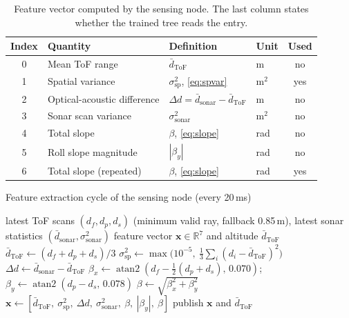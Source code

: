\documentclass[11pt,a4paper]{article}
\newcommand{\vect}[1]{\bm{#1}}
\begin{document}
\begin{table}[ht]
\centering
\small
\begin{tabular}{@{}c L{3.4cm} L{5.9cm} l c@{}}
\toprule
\textbf{Index} & \textbf{Quantity} & \textbf{Definition} & \textbf{Unit} & \textbf{Used}\\
 & Mean ToF range & $\bar d_{\mathrm{ToF}}$ & m & no\\
1 & Spatial variance & $\sigma^2_{\mathrm{sp}}$, \eqref{eq:spvar} & m$^2$ & yes\\
2 & Optical-acoustic difference & $\Delta d=\bar d_{\mathrm{sonar}}-\bar d_{\mathrm{ToF}}$ & m & no\\
3 & Sonar scan variance & $\sigma^2_{\mathrm{sonar}}$ & m$^2$ & no\\
4 & Total slope & $\beta$, \eqref{eq:slope} & rad & no\\
5 & Roll slope magnitude & $|\beta_y|$ & rad & no\\
6 & Total slope (repeated) & $\beta$, \eqref{eq:slope} & rad & yes\\
\bottomrule
\end{tabular}
\caption{Feature vector computed by the sensing node. The last column states whether the trained tree reads the entry.}
\label{tab:features}
\end{table}
 
\begin{algorithm}[ht]
\caption{Feature extraction cycle of the sensing node (every 20\,ms)}\label{alg:features}
\begin{algorithmic}[1]
\Require latest ToF scans $(d_f,d_p,d_s)$ (minimum valid ray, fallback 0.85\,m), latest sonar statistics $(\bar d_{\mathrm{sonar}},\sigma^2_{\mathrm{sonar}})$
\Ensure feature vector $\vect x\in\mathbb R^7$ and altitude $\bar d_{\mathrm{ToF}}$
\State $\bar d_{\mathrm{ToF}}\gets(d_f+d_p+d_s)/3$
\State $\sigma^2_{\mathrm{sp}}\gets\max\bigl(10^{-5},\ \tfrac13\sum_i(d_i-\bar d_{\mathrm{ToF}})^2\bigr)$
\State $\Delta d\gets\bar d_{\mathrm{sonar}}-\bar d_{\mathrm{ToF}}$
\State $\beta_x\gets\operatorname{atan2}(d_f-\tfrac12(d_p+d_s),\,0.070)$;\quad $\beta_y\gets\operatorname{atan2}(d_p-d_s,\,0.078)$
\State $\beta\gets\sqrt{\beta_x^2+\beta_y^2}$
\State $\vect x\gets[\bar d_{\mathrm{ToF}},\ \sigma^2_{\mathrm{sp}},\ \Delta d,\ \sigma^2_{\mathrm{sonar}},\ \beta,\ |\beta_y|,\ \beta]$
\State publish $\vect x$ and $\bar d_{\mathrm{ToF}}$
\end{algorithmic}
\end{algorithm}
 
\end{document}
